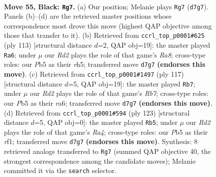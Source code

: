 \documentclass[11pt]{article}
\begin{document}
\clearpage

\begin{figure}[p]\centering
\begin{subfigure}{0.46\textwidth}\centering
\resizebox{\linewidth}{!}{%
\newchessgame
\chessboard[
  setfen={8/3r4/4K3/1p5k/8/8/8/8 b - - 5 55},
  showmover=false,
  pgfstyle=straightmove, color=movearrow, markmove={d7-g7}
]}
\caption{}
\end{subfigure}\hfill
\begin{subfigure}{0.46\textwidth}\centering
\resizebox{\linewidth}{!}{%
\newchessgame
\chessboard[
  setfen={2k5/8/8/7R/8/8/1K6/r7 b - - 15 57},
  showmover=false,
  pgfstyle=straightmove, color=movearrow, markmove={a1-a6}
]}
\caption{}
\end{subfigure}
\\[4pt]
\begin{subfigure}{0.46\textwidth}\centering
\resizebox{\linewidth}{!}{%
\newchessgame
\chessboard[
  setfen={8/8/R6p/8/6k1/2K5/1r6/8 b - - 1 59},
  showmover=false,
  pgfstyle=straightmove, color=movearrow, markmove={b2-b7}
]}
\caption{}
\end{subfigure}\hfill
\begin{subfigure}{0.46\textwidth}\centering
\resizebox{\linewidth}{!}{%
\newchessgame
\chessboard[
  setfen={2k5/8/4K3/r7/8/8/8/5R2 b - - 5 62},
  showmover=false,
  pgfstyle=straightmove, color=movearrow, markmove={a5-b5}
]}
\caption{}
\end{subfigure}
\caption{\textbf{Move 55, Black: \texttt{Rg7}.} (a) Our position; Melanie plays \texttt{Rg7} (\texttt{d7g7}). Panels (b)--(d) are the retrieved master positions whose correspondence most drove this move (highest QAP objective among those that transfer to it). (b) Retrieved from \texttt{ccrl\_top\_p0001\#625} (ply 113) [structural distance $d$=2, QAP obj=19]: the master played \texttt{Ra6}; under $\mu$ our \emph{Rd2} plays the role of that game's \emph{Ra8}; cross-type roles: our \emph{P}b5 as their \emph{r}h5; transferred move \texttt{d7g7} \textbf{(endorses this move)}. (c) Retrieved from \texttt{ccrl\_top\_p0001\#1497} (ply 117) [structural distance $d$=5, QAP obj=19]: the master played \texttt{Rb7}; under $\mu$ our \emph{Rd2} plays the role of that game's \emph{Rb7}; cross-type roles: our \emph{P}b5 as their \emph{r}a6; transferred move \texttt{d7g7} \textbf{(endorses this move)}. (d) Retrieved from \texttt{ccrl\_top\_p0001\#594} (ply 123) [structural distance $d$=5, QAP obj=0]: the master played \texttt{Rb5}; under $\mu$ our \emph{Rd2} plays the role of that game's \emph{Ra4}; cross-type roles: our \emph{P}b5 as their \emph{r}f1; transferred move \texttt{d7g7} \textbf{(endorses this move)}. Synthesis: 8 retrieved analogs transferred to \texttt{Rg7} (summed QAP objective 40, the strongest correspondence among the candidate moves); Melanie committed it via the \texttt{search} selector.}
\label{fig:thought-m109}
\end{figure}
\end{document}
